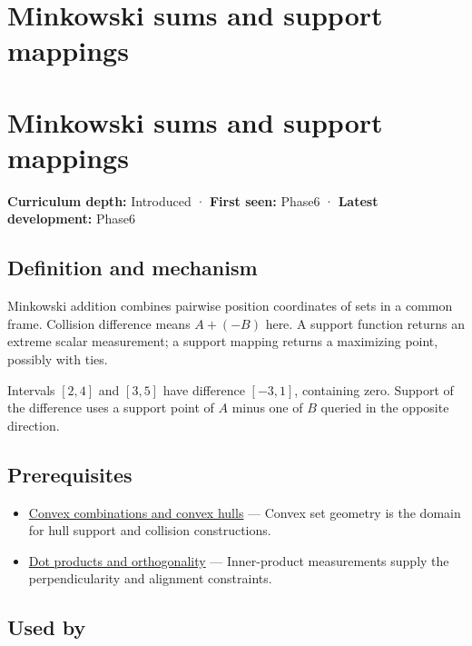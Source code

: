 \hypertarget{appendix-215ac7099a82}{}
\section*{Minkowski sums and support mappings}
\section{Minkowski sums and support mappings}\label{appendix-215ac7099a82-minkowski-sums-and-support-mappings}

\textbf{Curriculum depth:} Introduced · \textbf{First seen:} Phase6 · \textbf{Latest development:} Phase6

\subsection{Definition and mechanism}\label{appendix-215ac7099a82-definition-and-mechanism}

Minkowski addition combines pairwise position coordinates of sets in a common frame. Collision difference means \(A+(-B)\) here. A support function returns an extreme scalar measurement; a support mapping returns a maximizing point, possibly with ties.

Intervals \([2,4]\) and \([3,5]\) have difference \([-3,1]\), containing zero. Support of the difference uses a support point of \(A\) minus one of \(B\) queried in the opposite direction.

\subsection{Prerequisites}\label{appendix-215ac7099a82-prerequisites}

\begin{itemize}
\tightlist
\item
  \hyperref[appendix-0026ec42c9d5]{Convex combinations and convex hulls} --- Convex set geometry is the domain for hull support and collision constructions.
\item
  \hyperref[appendix-8bc4e8fc547c]{Dot products and orthogonality} --- Inner-product measurements supply the perpendicularity and alignment constraints.
\end{itemize}

\subsection{Used by}\label{appendix-215ac7099a82-used-by}

